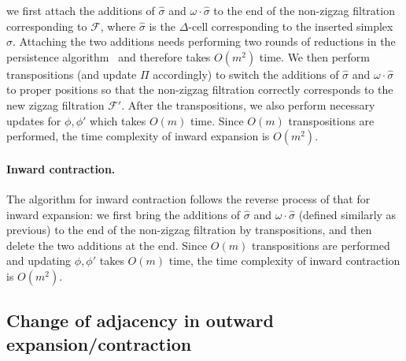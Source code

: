\documentclass[letterpaper,11pt]{article}
\theoremstyle{mythmstyle}
\theoremstyle{mydefstyle}
\theoremstyle{plain}
\theoremstyle{definition}
\newcommand{\<}[1]{\langle #1\rangle}
\newcommand{\lbarrowspace}{\;}
\newcommand{\inctosp}[1]{\xhookrightarrow{\lbarrowspace#1\lbarrowspace}}
\newcommand{\bakinctosp}[1]{\xhookleftarrow{\lbarrowspace#1\lbarrowspace}}
\newcommand{\Fcal}{\mathcal{F}}
\newcommand{\DG}{\Delta}
\newcommand{\oG}{\omega}
\newcommand{\sG}{\sigma}
\newcommand{\filtcnt}{m}
\begin{document}
\vspace{-0.5em}
\begin{center}
\end{center}

\vspace{-1em}\noindent
we first attach the additions of $\hat{\sG}$ and $\oG\cdot\hat{\sG}$ to the end of the non-zigzag filtration
corresponding to $\Fcal$,
where $\hat{\sG}$ is the $\DG$-cell corresponding to the inserted simplex $\sG$.
Attaching the two additions needs performing two rounds of reductions in 
the persistence algorithm~\cite{cohen2006vines,edelsbrunner2000topological}
and therefore takes $O(\filtcnt^2)$ time.
We then perform transpositions (and update $\Pi$ accordingly) 
to switch the additions of $\hat{\sG}$ and $\oG\cdot\hat{\sG}$
to proper positions so that the non-zigzag filtration
correctly corresponds to the new zigzag filtration $\Fcal'$.
After the transpositions, we also perform necessary updates for $\phi,\phi'$
which takes $O(\filtcnt)$ time.
Since $O(\filtcnt)$ transpositions are performed,
the time complexity of inward expansion
is $O(\filtcnt^2)$.

\paragraph{Inward contraction.}
The algorithm for inward contraction follows the reverse process of that for inward expansion:
we first bring the additions of $\hat{\sG}$ and $\oG\cdot\hat{\sG}$
(defined similarly as previous) to the end of the non-zigzag filtration
by transpositions, and then delete the two additions at the end.
Since $O(\filtcnt)$ transpositions are performed
and updating $\phi,\phi'$ takes $O(\filtcnt)$ time,
the time complexity of inward contraction
is $O(\filtcnt^2)$.

\subsection{Change of adjacency in outward expansion/contraction}
\label{sec:adj-change}
\end{document}
